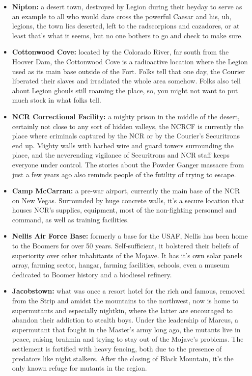 \documentclass[11pt]{article} %
\begin{document}
\begin{itemize}
\item \textbf{Nipton:} a desert town, destroyed by Legion during their heyday to serve as an example to all who would dare cross the powerful Caesar and his, uh, legions, the town lies deserted, left to the radscorpions and cazadores, or at least that's what it seems, but no one bothers to go and check to make sure.

\item \textbf{Cottonwood Cove:} located by the Colorado River, far south from the Hoover Dam, the Cottonwood Cove is a radioactive location where the Legion used as its main base outside of the Fort. Folks tell that one day, the Courier liberated their slaves and irradiated the whole area somehow. Folks also tell about Legion ghouls still roaming the place, so, you might not want to put much stock in what folks tell.

\item \textbf{NCR Correctional Facility:} a mighty prison in the middle of the desert, certainly not close to any sort of hidden valleys, the NCRCF is currently the place where criminals captured by the NCR or by the Courier's Securitrons end up. Mighty walls with barbed wire and guard towers surrounding the place, and the neverending vigilance of Securitrons and NCR staff keeps everyone under control. The stories about the Powder Ganger massacre from just a few years ago also reminds people of the futility of trying to escape.

\item \textbf{Camp McCarran:}  a pre-war airport, currently the main base of the NCR on New Vegas. Surrounded by huge concrete walls, it's a secure location that houses NCR's supplies, equipment, most of the non-fighting personnel and command, as well as training facilities.

\item \textbf{Nellis Air Force Base:} formerly a base for the USAF, Nellis has been home to the Boomers for over 50 years. Self-sufficient, it bolstered their beliefs of superiority over other inhabitants of the Mojave. It has it's own solar panels array, farming sector, hangar, farming facilities, schools, even a museum dedicated to Boomer history and a biodiesel refinery. 

\item \textbf{Jacobstown:} what was once a resort hotel for the rich and famous, removed from the Strip and amidst the mountains to the northwest, now is home to supermutants and especially nightkin, where the latter are encouraged to abandon their addiction to stealth boys. Under the leadership of Marcus, a supermutant that fought in the Master's army long ago, the mutants live in peace, raising brahmin and trying to stay out of the Mojave's problems. The settlement is fortified with heavy fencing, both due to the presence of predators like night stalkers. After the closing of Black Mountain, it's the only known refuge for mutants in the region.


\end{itemize}
\end{document}

